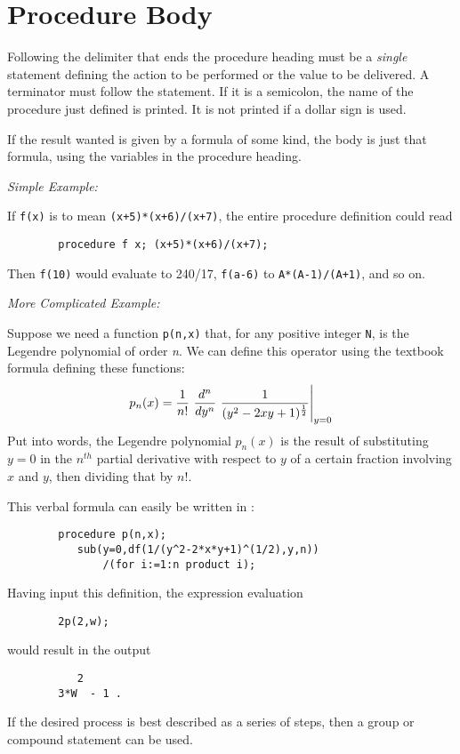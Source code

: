 \section{Procedure Body}

Following the delimiter that ends the procedure heading must be a {\em
single} statement defining the action to be performed or the value to be
delivered.  A terminator must follow the statement.  If it is a semicolon,
the name of the procedure just defined is printed.  It is not printed if a
dollar sign is used.

If the result wanted is given by a formula of some kind, the body is just
that formula, using the variables in the procedure heading.

{\it Simple Example:}

If {\tt f(x)} is to mean {\tt (x+5)*(x+6)/(x+7)}, the entire procedure
definition could read
\begin{verbatim}
        procedure f x; (x+5)*(x+6)/(x+7);
\end{verbatim}
Then {\tt f(10)} would evaluate to 240/17, {\tt f(a-6)} to
{\tt A*(A-1)/(A+1)}, and so on.

{\it More Complicated Example:}

Suppose we need a function {\tt p(n,x)} that, for any positive integer
{\tt N}, is the Legendre polynomial of order
{\em n}. We can define this operator using the
textbook formula defining these functions:
\begin{displaymath}
p_n(x) = \displaystyle{1\over{n!}}\
\displaystyle{d^n\over dy^n}\ \displaystyle{{1\over{(y^2 - 2xy + 1)
^{{1\over2}}}}}\Bigg\vert_{y=0}
\end{displaymath}
Put into words, the Legendre polynomial $p_n(x)$ is the result of
substituting $y=0$ in the $n^{th}$ partial derivative with respect to $y$
of a certain fraction involving $x$ and $y$, then dividing that by $n!$.

This verbal formula can easily be written in {\REDUCE}:
\begin{verbatim}
        procedure p(n,x);
           sub(y=0,df(1/(y^2-2*x*y+1)^(1/2),y,n))
               /(for i:=1:n product i);
\end{verbatim}
Having input this definition, the expression evaluation
\begin{verbatim}
        2p(2,w);
\end{verbatim}
would result in the output
\begin{verbatim}
           2
        3*W  - 1 .
\end{verbatim}
If the desired process is best described as a series of steps, then a group
or compound statement can be used.

